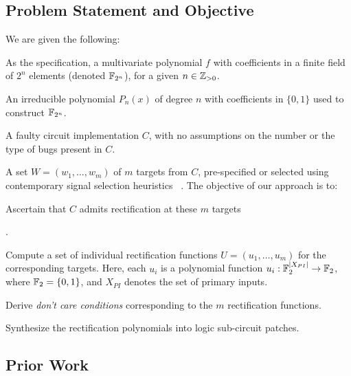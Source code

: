 \subsection{Problem Statement and Objective}
We are given the following: 
\bi
\item As the specification, a multivariate
polynomial $f$ with coefficients in a finite field of $2^n$ elements
(denoted ${\mathbb{F}}_{2^n}$), for a given  $n\in {\mathbb{Z}}_{> 0}$.
\item An irreducible
polynomial $P_n(x)$ of degree $n$ with coefficients in $\{0,1\}$ used 
to construct ${\mathbb{F}}_{2^n}$.
\item A faulty circuit implementation $C$,
with no assumptions on the number or the type of bugs present in
$C$. 
\item A set $W = (w_1,\dots,w_m)$ of $m$ targets from $C$,
pre-specified or selected using contemporary signal selection heuristics 
~\cite{SS_Alan:DAC18,SS_Fujita:ISCAS19,SS_Roland:DAC19}.
\ei
The objective of our approach is to: 
\bi
{\red \item Ascertain that $C$ 
admits rectification at these $m$ targets}.
\item Compute a set
of individual rectification functions $U =
(u_1,\dots,u_m)$ for the corresponding targets. Here, each $u_i$ is a 
polynomial function $u_i:{\mathbb{F}}_2^{|X_{PI}|}\rightarrow{\mathbb{F}}_2$, where ${\mathbb{F}}_2=\{0,1\}$, 
and $X_{PI}$ denotes the
set of primary inputs.
\item Derive {\it don't care conditions}
corresponding to the $m$ rectification functions. 
\item Synthesize
the rectification polynomials into logic sub-circuit patches.
\ei

\subsection{Prior Work}

